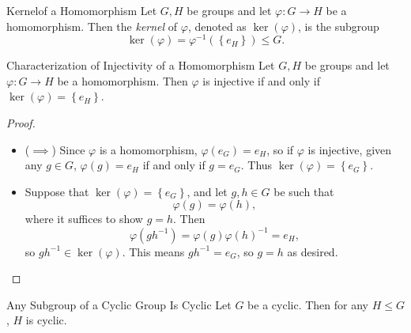 \documentclass[pmath347]{subfiles}
\begin{document}
    \begin{definition}{Kernel}{of a Homomorphism}
        Let $G,H$ be groups and let $\varphi:G\to H$ be a homomorphism. Then the \emph{kernel} of $\varphi$, denoted as $\ker\left( \varphi \right)$, is the subgroup
        \begin{equation*}
            \ker\left( \varphi \right) = \varphi^{-1} \left( \left\lbrace e_H \right\rbrace  \right)\leq G. 
        \end{equation*}
    \end{definition}

    \begin{prop}{Characterization of Injectivity of a Homomorphism}
        Let $G,H$ be groups and let $\varphi:G\to H$ be a homomorphism. Then $\varphi$ is injective if and only if $\ker\left( \varphi \right) = \left\lbrace e_H \right\rbrace $.
    \end{prop}

    \begin{proof}
        \begin{itemize}
            \item ($\implies$) Since $\varphi$ is a homomorphism, $\varphi\left( e_G \right) = e_H$, so if $\varphi$ is injective, given any $g\in G$, $\varphi\left( g \right) = e_H$ if and only if $g=e_G$. Thus $\ker\left( \varphi \right) = \left\lbrace e_G \right\rbrace$. \qqqedsym
            \item Suppose that $\ker\left( \varphi \right) = \left\lbrace e_G \right\rbrace$, and let $g,h\in G$ be such that
                \begin{equation*}
                    \varphi\left( g \right) = \varphi\left( h \right) ,
                \end{equation*}
                where it suffices to show $g=h$. Then
                \begin{equation*}
                    \varphi\left( gh^{-1}  \right) = \varphi\left( g \right) \varphi\left( h \right) ^{-1} = e_H,
                \end{equation*}
                so $gh^{-1} \in \ker\left( \varphi \right)$. This means $gh^{-1} = e_G$, so $g=h$ as desired. \qqedsym
        \end{itemize} 
    \end{proof}

    \begin{prop}{Any Subgroup of a Cyclic Group Is Cyclic}
        Let $G$ be a cyclic. Then for any $H\leq G$, $H$ is cyclic.
    \end{prop}
\end{document}
